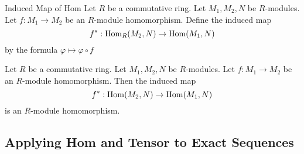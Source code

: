 \documentclass[a4paper]{article}
\begin{document}
\begin{defn}{Induced Map of Hom}{} Let $R$ be a commutative ring. Let $M_1,M_2,N$ be $R$-modules. Let $f:M_1\to M_2$ be an $R$-module homomorphism. Define the induced map $$f^\ast:\operatorname{Hom}_R(M_2,N)\to\operatorname{Hom}(M_1,N)$$ by the formula $\varphi\mapsto\varphi\circ f$
\end{defn}

\begin{lmm}{}{} Let $R$ be a commutative ring. Let $M_1,M_2,N$ be $R$-modules. Let $f:M_1\to M_2$ be an $R$-module homomorphism. Then the induced map $$f^\ast:\operatorname{Hom}(M_2,N)\to\operatorname{Hom}(M_1,N)$$ is an $R$-module homomorphism. 
\end{lmm}

\subsection{Applying Hom and Tensor to Exact Sequences}
\end{document}
